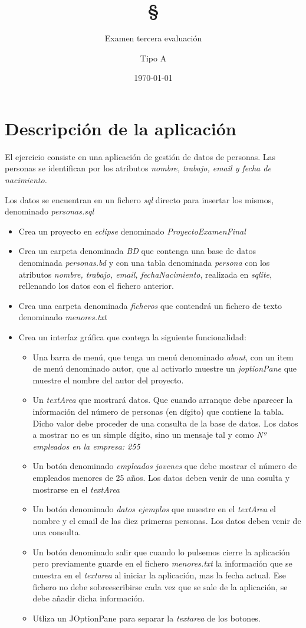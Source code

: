 \documentclass[4paper]{article}
\author{Examen tercera evaluación}
\author{Tipo A}
\title{\textbf{\S}}
\date{\today}
\begin{document}
\maketitle 
\section*{Descripción de la aplicación}
El ejercicio consiste en una aplicación de gestión de datos de personas. Las personas se identifican por los atributos \emph{nombre, trabajo, email y  fecha de nacimiento.}\par 
Los datos se encuentran en un fichero \emph{sql} directo para insertar los mismos, denominado \emph{personas.sql}
\begin{itemize}
\item Crea un proyecto en \emph{eclipse} denominado \emph{ProyectoExamenFinal}
\item Crea un carpeta denominada \emph{BD} que contenga una base de datos denominada \emph{personas.bd} y con una tabla denominada \emph{persona} con los atributos \emph{ nombre, trabajo, email, fechaNacimiento}, realizada en \emph{sqlite}, rellenando los datos con el fichero anterior.
\item Crea una carpeta denominada \emph{ficheros} que contendrá un fichero de texto denominado \emph{menores.txt}
\item Crea un interfaz gráfica que contega la siguiente funcionalidad:

\begin{itemize}
\item Una barra de menú, que tenga un menú denominado \emph{about}, con un item de menú denominado autor, que al activarlo muestre un \emph{joptionPane} que muestre el nombre del autor del proyecto.
\item Un \emph{textArea} que mostrará datos. Que cuando arranque debe aparecer la información del número de personas (en dígito) que contiene la tabla. Dicho valor debe proceder de una consulta de la base de datos. Los datos a mostrar no es un simple dígito, sino un mensaje tal y como \emph{Nº empleados en la empresa: 255}
\item Un botón denominado \emph{empleados jovenes} que debe mostrar el número de empleados menores de 25 años. Los datos deben venir de una cosulta y mostrarse en el \emph{textArea}
\item Un botón denominado \emph{datos ejemplos} que muestre en el \emph{textArea} el nombre y el email de las diez primeras personas. Los datos deben venir de una consulta.
\item Un botón denominado salir que cuando lo pulsemos cierre la aplicación pero previamente guarde en el fichero  \emph{menores.txt} la información que se muestra en el \emph{textarea} al iniciar la aplicación, mas la fecha actual. Ese fichero no debe sobreescribirse cada vez que se sale de la aplicación, se debe añadir dicha información.
\item Utliza un JOptionPane para separar la \emph{textarea} de los botones.
\end{itemize}


\end{itemize}
\end{document}
